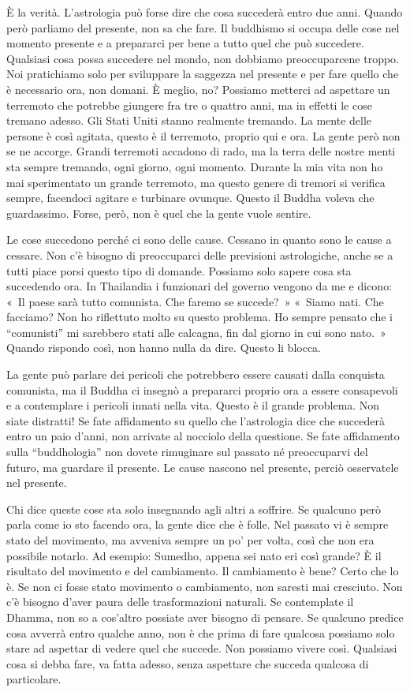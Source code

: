 È la verità. L'astrologia può forse dire che cosa succederà entro due
anni. Quando però parliamo del presente, non sa che fare. Il buddhismo
si occupa delle cose nel momento presente e a prepararci per bene a
tutto quel che può succedere. Qualsiasi cosa possa succedere nel mondo,
non dobbiamo preoccuparcene troppo. Noi pratichiamo solo per sviluppare
la saggezza nel presente e per fare quello che è necessario ora, non
domani. È meglio, no? Possiamo metterci ad aspettare un terremoto che
potrebbe giungere fra tre o quattro anni, ma in effetti le cose tremano
adesso. Gli Stati Uniti stanno realmente tremando. La mente delle
persone è così agitata, questo è il terremoto, proprio qui e ora. La
gente però non se ne accorge. Grandi terremoti accadono di rado, ma la
terra delle nostre menti sta sempre tremando, ogni giorno, ogni momento.
Durante la mia vita non ho mai sperimentato un grande terremoto, ma
questo genere di tremori si verifica sempre, facendoci agitare e
turbinare ovunque. Questo il Buddha voleva che guardassimo. Forse, però,
non è quel che la gente vuole sentire.

Le cose succedono perché ci sono delle cause. Cessano in quanto sono le
cause a cessare. Non c'è bisogno di preoccuparci delle previsioni
astrologiche, anche se a tutti piace porsi questo tipo di domande.
Possiamo solo sapere cosa sta succedendo ora. In Thailandia i funzionari
del governo vengono da me e dicono: «~Il paese sarà tutto comunista. Che
faremo se succede?~» «~Siamo nati. Che facciamo? Non ho riflettuto molto
su questo problema. Ho sempre pensato che i ``comunisti'' mi sarebbero
stati alle calcagna, fin dal giorno in cui sono nato.~» Quando rispondo
così, non hanno nulla da dire. Questo li blocca.

La gente può parlare dei pericoli che potrebbero essere causati dalla
conquista comunista, ma il Buddha ci insegnò a prepararci proprio ora a
essere consapevoli e a contemplare i pericoli innati nella vita. Questo
è il grande problema. Non siate distratti! Se fate affidamento su quello
che l'astrologia dice che succederà entro un paio d'anni, non arrivate
al nocciolo della questione. Se fate affidamento sulla ``buddhologia''
non dovete rimuginare sul passato né preoccuparvi del futuro, ma
guardare il presente. Le cause nascono nel presente, perciò osservatele
nel presente.

Chi dice queste cose sta solo insegnando agli altri a soffrire. Se
qualcuno però parla come io sto facendo ora, la gente dice che è folle.
Nel passato vi è sempre stato del movimento, ma avveniva sempre un po'
per volta, così che non era possibile notarlo. Ad esempio: Sumedho,
appena sei nato eri così grande? È il risultato del movimento e del
cambiamento. Il cambiamento è bene? Certo che lo è. Se non ci fosse
stato movimento o cambiamento, non saresti mai cresciuto. Non c'è
bisogno d'aver paura delle trasformazioni naturali. Se contemplate il
Dhamma, non so a cos'altro possiate aver bisogno di pensare. Se qualcuno
predice cosa avverrà entro qualche anno, non è che prima di fare
qualcosa possiamo solo stare ad aspettar di vedere quel che succede. Non
possiamo vivere così. Qualsiasi cosa si debba fare, va fatta adesso,
senza aspettare che succeda qualcosa di particolare.

